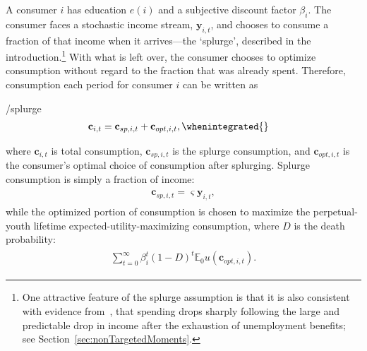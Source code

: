 \documentclass[\PathToRoot/\ProjectName]{subfiles}
\begin{document}
A consumer $i$ has education $e(i)$ and a subjective discount factor $\beta_i$. The consumer faces a stochastic income stream, $\mathbf{y}_{i,t}$, and chooses to consume a fraction of that income when it arrives---the `splurge', described in the introduction.\footnote{One attractive feature of the splurge assumption is that it is also consistent with evidence from~\cite{ganongConsumer2019}, that spending drops sharply following the large and predictable drop in income after the exhaustion of unemployment benefits; see Section~\ref{sec:nonTargetedMoments}.} With what is left over, the consumer chooses to optimize consumption without regard to the fraction that was already spent. Therefore, consumption each period for consumer $i$ can be written as
\begin{verbatimwrite}{\EqDir/splurge}
\begin{equation}
  \begin{gathered}
    \begin{aligned}
      \mathbf{c}_{i,t} & = \mathbf{c}_{sp,i,t} + \mathbf{c}_{opt,i,t}, \whenintegrated{\label{eq:model}} 
    \end{aligned}
  \end{gathered}
\end{equation}
\end{verbatimwrite}

{\noindent}where $\mathbf{c}_{i,t}$ is total consumption, $\mathbf{c}_{sp,i,t}$ is the splurge consumption, and $\mathbf{c}_{opt,i,t}$ is the consumer's optimal choice of consumption after splurging.
Splurge consumption is simply a fraction of income:
\begin{equation}
  \begin{gathered}
    \begin{aligned}
      \mathbf{c}_{sp,i,t} = \varsigma \mathbf{y}_{i,t},
    \end{aligned}
  \end{gathered}
\end{equation}
while the optimized portion of consumption is chosen to maximize the perpetual-youth lifetime expected-utility-maximizing consumption, where $D$ is the death probability:
\begin{equation}
  \begin{gathered}
    \begin{aligned}
      \sum_{t=0}^{\infty}\beta_i^t (1-D)^t \mathbb{E}_0 u(\mathbf{c}_{opt,i,t}).
    \end{aligned}
  \end{gathered}
\end{equation}
\end{document}
